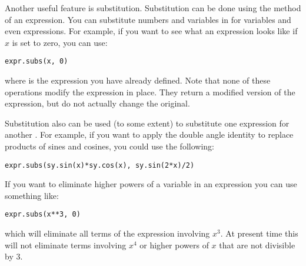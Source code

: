 Another useful feature is substitution.
Substitution can be done using the  method of an expression.
You can substitute numbers and variables in for variables and even expressions.
For example, if you want to see what an expression looks like if $x$ is set to zero, you can use:
\begin{lstlisting}
expr.subs(x, 0)
\end{lstlisting}
where  is the expression you have already defined.
Note that none of these operations modify the expression in place.
They return a modified version of the expression, but do not actually change the original.

Substitution also can be used (to some extent) to substitute one expression for another .
For example, if you want to apply the double angle identity to replace products of sines and cosines, you could use the following:
\begin{lstlisting}
expr.subs(sy.sin(x)*sy.cos(x), sy.sin(2*x)/2)
\end{lstlisting}
If you want to eliminate higher powers of a variable in an expression you can use something like:
\begin{lstlisting}
expr.subs(x**3, 0)
\end{lstlisting}
which will eliminate all terms of the expression involving $x^3$.
At present time this will not eliminate terms involving $x^4$ or higher powers of $x$ that are not divisible by 3.


